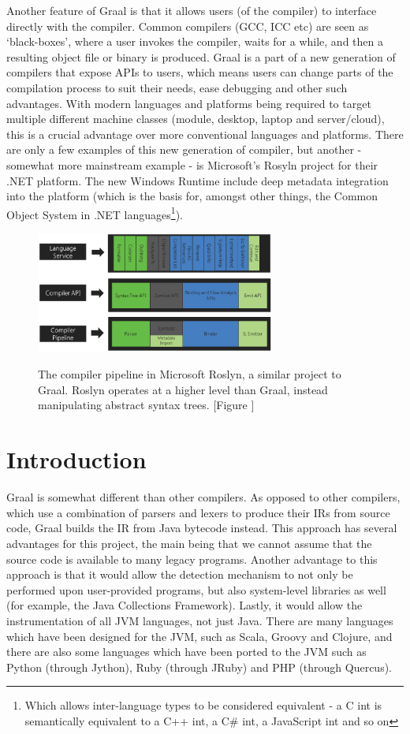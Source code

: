 Another feature of Graal is that it allows users (of the compiler) to interface directly with the compiler. Common compilers (GCC, ICC etc) are seen as `black-boxes', where a user invokes the compiler, waits for a while, and then a resulting object file or binary is produced. Graal is a part of a new generation of compilers that expose APIs to users, which means users can change parts of the compilation process to suit their needs, ease debugging and other such advantages. With modern languages and platforms being required to target multiple different machine classes (module, desktop, laptop and server/cloud), this is a crucial advantage over more conventional languages and platforms. There are only a few examples of this new generation of compiler, but another - somewhat more mainstream example - is Microsoft's Rosyln project \citep{RoslynProject} for their .NET platform. The new Windows Runtime include deep metadata integration into the platform (which is the basis for, amongst other things, the Common Object System in .NET languages\footnote{Which allows inter-language types to be considered equivalent - a C int is semantically equivalent to a C++ int, a C\# int, a JavaScript int and so on}).

\begin{figure}
	\centering
	\includegraphics[width=0.7\textwidth]{graphics/roslyn-pipeline.pdf}
	\label{fig:roslyn-pipeline}
	\caption{The compiler pipeline in Microsoft Roslyn, a similar project to Graal. Roslyn operates at a higher level than Graal, instead manipulating abstract syntax trees. [Figure \citealp{RoslynProject}]}
\end{figure}

\section{Introduction} \label{sec:graal/introduction}
Graal is somewhat different than other compilers. As opposed to other compilers, which use a combination of parsers and lexers to produce their IRs from source code, Graal builds the IR from Java bytecode instead. This approach has several advantages for this project, the main being that we cannot assume that the source code is available to many legacy programs. Another advantage to this approach is that it would allow the detection mechanism to not only be performed upon user-provided programs, but also system-level libraries as well (for example, the Java Collections Framework). Lastly, it would allow the instrumentation of all JVM languages, not just Java. There are many languages which have been designed for the JVM, such as Scala, Groovy and Clojure, and there are also some languages which have been ported to the JVM such as Python (through Jython), Ruby (through JRuby) and PHP (through Quercus).

